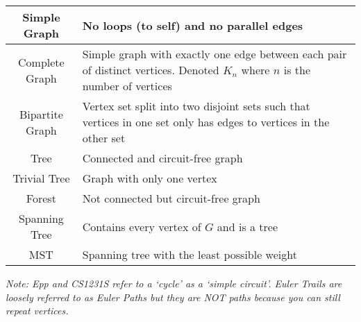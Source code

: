 \documentclass{article}
\begin{document}
\begin{description}
\begin{table}[H]
\begin{tabular}{|c|p{4in}|}
			\hline
			Simple Graph & \hfil No loops (to self) and no parallel edges \\
			\hline
			Complete Graph & Simple graph with exactly one edge between each pair of distinct vertices. Denoted $K_{n}$ where $n$ is the number of vertices \\ 
			\hline
			Bipartite Graph & Vertex set split into two disjoint sets such that vertices in one set only has edges to vertices in the other set \\
			\hline
			Tree & \hfil Connected and circuit-free graph \\ 
			\hline 
			Trivial Tree & \hfil Graph with only one vertex \\
			\hline 
			Forest & \hfil Not connected but circuit-free graph \\
			\hline
			Spanning Tree & \hfil Contains every vertex of $G$ and is a tree \\ 
			\hline
			MST & \hfil Spanning tree with the least possible weight \\
			\hline
		\end{tabular}
	\end{table}	  
	\endgroup
	
	\item \emph{Note: Epp and CS1231S refer to a `cycle' as a `simple circuit'. Euler Trails are loosely referred to as Euler Paths but they are NOT paths because you can still repeat vertices.}
	
\end{description}


\newpage
\end{document}
